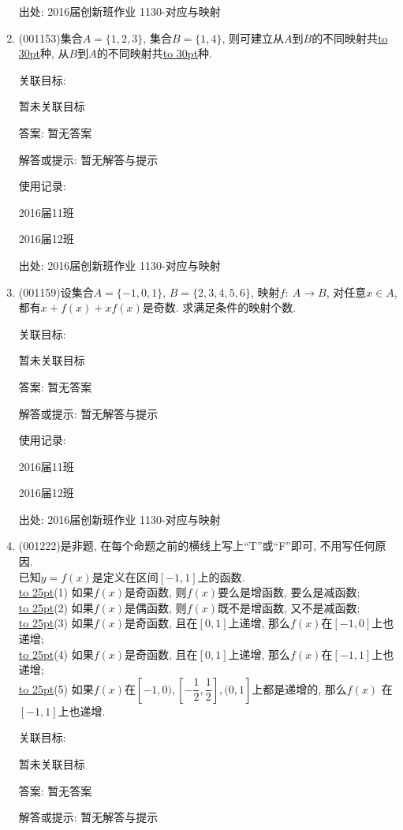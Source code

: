 \documentclass[10pt,a4paper]{article}
\newcommand{\blank}[1]{\underline{\hbox to #1pt{}}}
\begin{document}
\begin{enumerate}[1.]
出处: 2016届创新班作业	1130-对应与映射
\item { (001153)}集合$A=\{1,2,3\}$, 集合$B=\{1,4\}$, 则可建立从$A$到$B$的不同映射共\blank{30}种, 从$B$到$A$的不同映射共\blank{30}种.


关联目标:

暂未关联目标

答案: 暂无答案

解答或提示: 暂无解答与提示

使用记录:

2016届11班	

2016届12班	


出处: 2016届创新班作业	1130-对应与映射
\item { (001159)}设集合$A=\{-1, 0, 1\}$, $B=\{2,3,4,5,6\}$, 映射$f:\ A\rightarrow B$, 对任意$x\in A$, 都有$x+f(x)+xf(x)$是奇数. 求满足条件的映射个数.


关联目标:

暂未关联目标

答案: 暂无答案

解答或提示: 暂无解答与提示

使用记录:

2016届11班	

2016届12班	


出处: 2016届创新班作业	1130-对应与映射
\item { (001222)}是非题, 在每个命题之前的横线上写上``T''或``F''即可, 不用写任何原因.\\ 
已知$y=f(x)$是定义在区间$[-1,1]$上的函数.\\ 
\blank{25}(1) 如果$f(x)$是奇函数, 则$f(x)$要么是增函数, 要么是减函数;\\ 
\blank{25}(2) 如果$f(x)$是偶函数, 则$f(x)$既不是增函数, 又不是减函数;\\ 
\blank{25}(3) 如果$f(x)$是奇函数, 且在$[0,1]$上递增, 那么$f(x)$在$[-1,0]$上也递增;\\ 
\blank{25}(4) 如果$f(x)$是奇函数, 且在$[0,1]$上递增, 那么$f(x)$在$[-1,1]$上也递增;\\ 
\blank{25}(5) 如果$f(x)$在$[-1,0),[-\dfrac{1}{2},\dfrac{1}{2}],(0,1]$上都是递增的, 那么$f(x)$ 在$[-1,1]$上也递增.


关联目标:

暂未关联目标

答案: 暂无答案

解答或提示: 暂无解答与提示


\end{enumerate}
\end{document}
